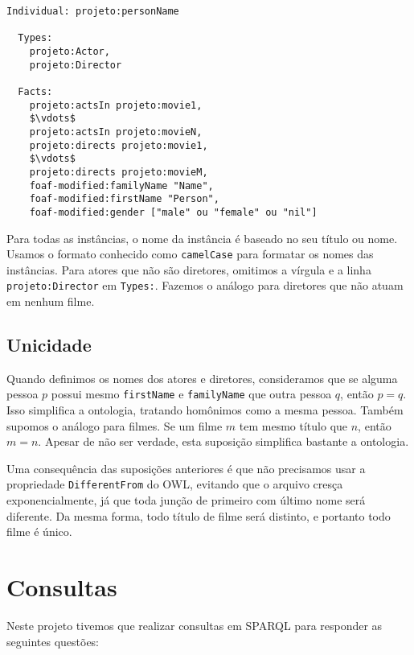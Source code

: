 \documentclass{article}
\newcommand{\code}[1]{\lstinline[mathescape=true]{#1}}
\begin{document}
\newpage

\begin{lstlisting}[frame=single,mathescape=true]
Individual: projeto:personName

  Types:
    projeto:Actor,
    projeto:Director

  Facts:
    projeto:actsIn projeto:movie1,
    $\vdots$
    projeto:actsIn projeto:movieN,
    projeto:directs projeto:movie1,
    $\vdots$
    projeto:directs projeto:movieM,
    foaf-modified:familyName "Name",
    foaf-modified:firstName "Person",
    foaf-modified:gender ["male" ou "female" ou "nil"]
\end{lstlisting}

Para todas as instâncias, o nome da instância é baseado no seu título ou nome. Usamos o formato
conhecido como \code{camelCase} para formatar os nomes das instâncias. Para atores que não são
diretores, omitimos a vírgula e a linha \code{projeto:Director} em \code{Types:}. Fazemos o análogo
para diretores que não atuam em nenhum filme.

\subsection{Unicidade}

Quando definimos os nomes dos atores e diretores, consideramos que se alguma pessoa $p$ possui
mesmo \code{firstName} e \code{familyName} que outra pessoa $q$, então $p=q$. Isso simplifica a
ontologia, tratando homônimos como a mesma pessoa. Também supomos o análogo para filmes. Se um
filme $m$ tem mesmo título que $n$, então $m=n$. Apesar de não ser verdade, esta suposição
simplifica bastante a ontologia.

Uma consequência das suposições anteriores é que não precisamos usar a propriedade
\code{DifferentFrom} do OWL, evitando que o arquivo cresça exponencialmente, já que toda junção de
primeiro com último nome será diferente. Da mesma forma, todo título de filme será distinto, e
portanto todo filme é único.

\section{Consultas}


Neste projeto tivemos que realizar consultas em SPARQL para responder as seguintes questões:
\end{document}

